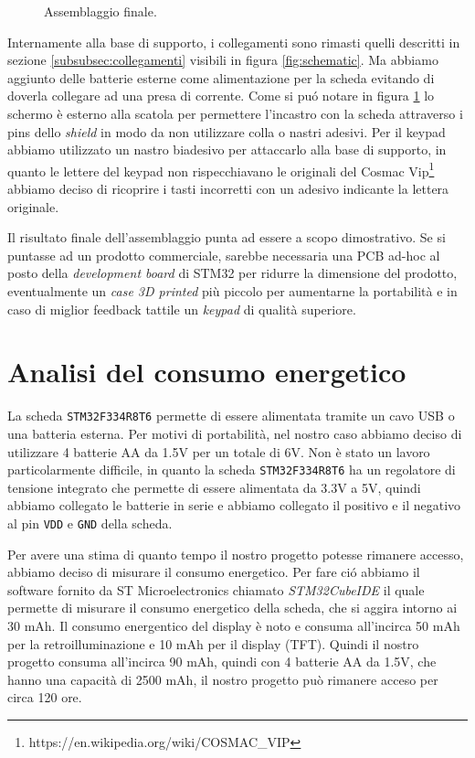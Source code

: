 \documentclass[a4paper]{article}
\begin{document}
\begin{figure}[h!t]
\begin{center}
    \end{center}
    \caption{Assemblaggio finale.}
    \label{fig:assemblaggio}
\end{figure}

Internamente alla base di supporto, i collegamenti sono rimasti quelli descritti in sezione \ref{subsubsec:collegamenti} visibili in figura \ref{fig:schematic}. Ma abbiamo aggiunto delle batterie esterne come alimentazione per la scheda evitando di doverla collegare ad una presa di corrente. Come si pu\'o notare in figura \ref{fig:assemblaggio} lo schermo è esterno alla scatola per permettere l'incastro con la scheda attraverso i pins dello \textit{shield} in modo da non utilizzare colla o nastri adesivi. Per il keypad abbiamo utilizzato un nastro biadesivo per attaccarlo alla base di supporto, in quanto le lettere del keypad non rispecchiavano le originali del Cosmac Vip\footnote{https://en.wikipedia.org/wiki/COSMAC\_VIP} abbiamo deciso di ricoprire i tasti incorretti con un adesivo indicante la lettera originale.

Il risultato finale dell'assemblaggio punta ad essere a scopo dimostrativo. Se si puntasse ad un prodotto commerciale, sarebbe necessaria una PCB ad-hoc al posto della \textit{development board} di STM32 per ridurre la dimensione del prodotto, eventualmente un \textit{case 3D printed} più piccolo per aumentarne la portabilità e in caso di miglior feedback tattile un \textit{keypad} di qualità superiore.

\section{Analisi del consumo energetico}

La scheda \texttt{STM32F334R8T6} permette di essere alimentata tramite un cavo USB o una batteria esterna. Per motivi di portabilità, nel nostro caso abbiamo deciso di utilizzare 4 batterie AA da 1.5V per un totale di 6V. Non è stato un lavoro particolarmente difficile, in quanto la scheda \texttt{STM32F334R8T6} ha un regolatore di tensione integrato che permette di essere alimentata da 3.3V a 5V, quindi abbiamo collegato le batterie in serie e abbiamo collegato il positivo e il negativo al pin \texttt{VDD} e \texttt{GND} della scheda.

Per avere una stima di quanto tempo il nostro progetto potesse rimanere accesso, abbiamo deciso di misurare il consumo energetico. Per fare ci\'o abbiamo il software fornito da ST Microelectronics chiamato \textit{STM32CubeIDE} il quale permette di misurare il consumo energetico della scheda, che si aggira intorno ai 30 mAh. Il consumo energentico del display è noto e consuma all'incirca 50 mAh per la retroilluminazione e 10 mAh per il display (TFT). Quindi il nostro progetto consuma all'incirca 90 mAh, quindi con 4 batterie AA da 1.5V, che hanno una capacità di 2500 mAh, il nostro progetto può rimanere acceso per circa 120 ore.
\end{document}
